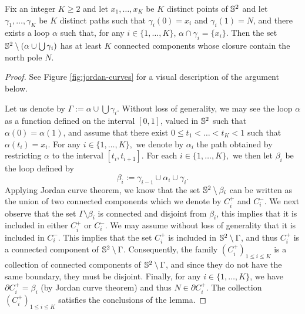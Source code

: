 \documentclass[12pt]{amsart}
\numberwithin{equation}{section}
\begin{document}
	
	\begin{lemma} \label{lemma:jordan-curves-theorem}
		Fix an integer $K \geq 2$ and let $x_1, \ldots, x_K$ be $K$ distinct points of $\S^2$ and let $\gamma_1 , \ldots, \gamma_K$ be $K$ distinct paths such that $\gamma_i(0) = x_i$ and $\gamma_i(1) = N$, and there exists a loop $\alpha$ such that, for any $i \in \{1 , \ldots, K\}$, $\alpha \cap \gamma_i = \{ x_i \}.$
		Then the set $\S^2 \setminus \left( \alpha \cup \bigcup \gamma_i\right)$ has at least $K$ connected components whose closure contain the north pole $N$.
	\end{lemma}
	
	\begin{proof}
		See Figure \ref{fig:jordan-curves} for a visual description of the argument below. 
		
		Let us denote by $\Gamma := \alpha \cup \bigcup \gamma_i  $. Without loss of generality, we may see the loop $\alpha$ as a function defined on the interval $[0 , 1]$, valued in $\S^2$ such that $\alpha(0) = \alpha(1)$, and assume that there exist $ 0 \leq t_1 < \ldots < t_K < 1$ such that $\alpha(t_i) = x_i$. For any $i \in \{ 1 , \ldots, K \},$ we denote by $\alpha_i$ the path obtained by restricting $\alpha$ to the interval $[t_i , t_{i+1}].$ For each $i \in \{ 1 , \ldots, K\},$ we then let $\beta_i$ be the loop defined by
		\begin{equation} \label{eq:concatenated-curve}
			\beta_i := \gamma_{i-1} \cup \alpha_i \cup  \gamma_{i}.
		\end{equation}
		Applying Jordan curve theorem, we know that the set $\S^2 \setminus \beta_i$ can be written as the union of two connected components which we denote by $C_{i}^+$ and $C_{i}^-$. We next observe that the set $\Gamma \setminus \beta_i$ is connected and disjoint from $\beta_i$, this implies that it is included in either $C_{i}^+$ or $C_{i}^-$. We may assume without loss of generality that it is included in $C_{i}^-$. This implies that the set $C_{i}^+$ is included in $\S^2 \setminus \Gamma$, and thus $C_{i}^+$ is a connected component of $\S^2 \setminus \Gamma$. Consequently, the family $(C_{i}^+)_{1 \leq i \leq K}$ is a collection of connected components of $\S^2 \setminus \Gamma$, and since they do not have the same boundary, they must be disjoint. Finally, for any $i \in \{ 1 , \ldots, K\}$, we have $\partial C_{i}^+ = \beta_i$ (by Jordan curve theorem) and thus $N \in \partial C_{i}^+$. The collection $(C_{i}^+)_{1 \leq i \leq K}$ satisfies the conclusions of the lemma.
	\end{proof}
	
\end{document}
